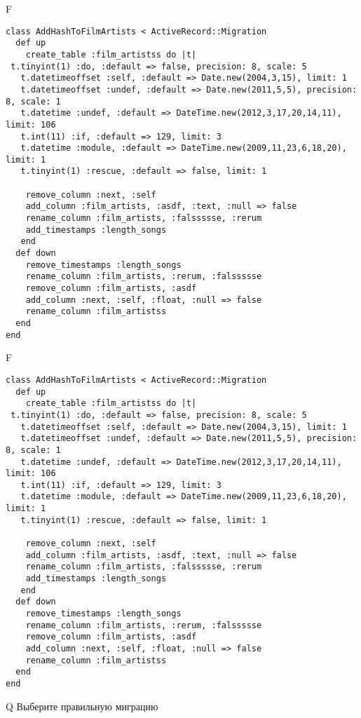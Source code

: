 F
\begin{verbatim}
class AddHashToFilmArtists < ActiveRecord::Migration
  def up
    create_table :film_artistss do |t| 
 t.tinyint(1) :do, :default => false, precision: 8, scale: 5
   t.datetimeoffset :self, :default => Date.new(2004,3,15), limit: 1
   t.datetimeoffset :undef, :default => Date.new(2011,5,5), precision: 8, scale: 1
   t.datetime :undef, :default => DateTime.new(2012,3,17,20,14,11), limit: 106
   t.int(11) :if, :default => 129, limit: 3
   t.datetime :module, :default => DateTime.new(2009,11,23,6,18,20), limit: 1
   t.tinyint(1) :rescue, :default => false, limit: 1

    remove_column :next, :self
    add_column :film_artists, :asdf, :text, :null => false
    rename_column :film_artists, :falssssse, :rerum
    add_timestamps :length_songs
   end
  def down
    remove_timestamps :length_songs
    rename_column :film_artists, :rerum, :falssssse
    remove_column :film_artists, :asdf
    add_column :next, :self, :float, :null => false
    rename_column :film_artistss
  end
end
\end{verbatim}

F
\begin{verbatim}
class AddHashToFilmArtists < ActiveRecord::Migration
  def up
    create_table :film_artistss do |t| 
 t.tinyint(1) :do, :default => false, precision: 8, scale: 5
   t.datetimeoffset :self, :default => Date.new(2004,3,15), limit: 1
   t.datetimeoffset :undef, :default => Date.new(2011,5,5), precision: 8, scale: 1
   t.datetime :undef, :default => DateTime.new(2012,3,17,20,14,11), limit: 106
   t.int(11) :if, :default => 129, limit: 3
   t.datetime :module, :default => DateTime.new(2009,11,23,6,18,20), limit: 1
   t.tinyint(1) :rescue, :default => false, limit: 1

    remove_column :next, :self
    add_column :film_artists, :asdf, :text, :null => false
    rename_column :film_artists, :falssssse, :rerum
    add_timestamps :length_songs
   end
  def down
    remove_timestamps :length_songs
    rename_column :film_artists, :rerum, :falssssse
    remove_column :film_artists, :asdf
    add_column :next, :self, :float, :null => false
    rename_column :film_artistss
  end
end
\end{verbatim}
Q
Выберите правильную миграцию

